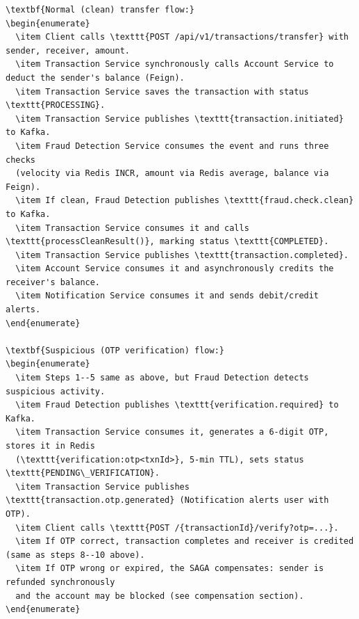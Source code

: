 \documentclass[12pt,a4paper]{article}
\begin{document}
\begin{lstlisting}[language={}]
\textbf{Normal (clean) transfer flow:}
\begin{enumerate}
  \item Client calls \texttt{POST /api/v1/transactions/transfer} with sender, receiver, amount.
  \item Transaction Service synchronously calls Account Service to deduct the sender's balance (Feign).
  \item Transaction Service saves the transaction with status \texttt{PROCESSING}.
  \item Transaction Service publishes \texttt{transaction.initiated} to Kafka.
  \item Fraud Detection Service consumes the event and runs three checks
  (velocity via Redis INCR, amount via Redis average, balance via Feign).
  \item If clean, Fraud Detection publishes \texttt{fraud.check.clean} to Kafka.
  \item Transaction Service consumes it and calls \texttt{processCleanResult()}, marking status \texttt{COMPLETED}.
  \item Transaction Service publishes \texttt{transaction.completed}.
  \item Account Service consumes it and asynchronously credits the receiver's balance.
  \item Notification Service consumes it and sends debit/credit alerts.
\end{enumerate}

\textbf{Suspicious (OTP verification) flow:}
\begin{enumerate}
  \item Steps 1--5 same as above, but Fraud Detection detects suspicious activity.
  \item Fraud Detection publishes \texttt{verification.required} to Kafka.
  \item Transaction Service consumes it, generates a 6-digit OTP, stores it in Redis
  (\texttt{verification:otp<txnId>}, 5-min TTL), sets status \texttt{PENDING\_VERIFICATION}.
  \item Transaction Service publishes \texttt{transaction.otp.generated} (Notification alerts user with OTP).
  \item Client calls \texttt{POST /{transactionId}/verify?otp=...}.
  \item If OTP correct, transaction completes and receiver is credited (same as steps 8--10 above).
  \item If OTP wrong or expired, the SAGA compensates: sender is refunded synchronously
  and the account may be blocked (see compensation section).
\end{enumerate}


\end{lstlisting}
\end{document}
